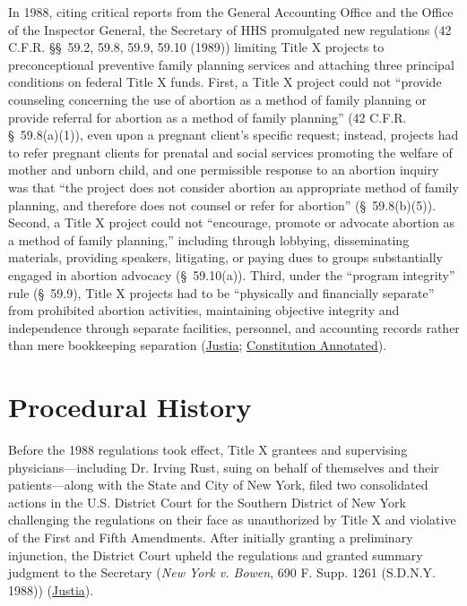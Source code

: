 \documentclass[12pt]{article}
\begin{document}
In 1988, citing critical reports from the General Accounting Office and the Office of the Inspector General, the Secretary of HHS promulgated new regulations (42 C.F.R. \S\S~59.2, 59.8, 59.9, 59.10 (1989)) limiting Title X projects to preconceptional preventive family planning services and attaching three principal conditions on federal Title X funds. First, a Title X project could not ``provide counseling concerning the use of abortion as a method of family planning or provide referral for abortion as a method of family planning'' (42 C.F.R. \S~59.8(a)(1)), even upon a pregnant client's specific request; instead, projects had to refer pregnant clients for prenatal and social services promoting the welfare of mother and unborn child, and one permissible response to an abortion inquiry was that ``the project does not consider abortion an appropriate method of family planning, and therefore does not counsel or refer for abortion'' (\S~59.8(b)(5)). Second, a Title X project could not ``encourage, promote or advocate abortion as a method of family planning,'' including through lobbying, disseminating materials, providing speakers, litigating, or paying dues to groups substantially engaged in abortion advocacy (\S~59.10(a)). Third, under the ``program integrity'' rule (\S~59.9), Title X projects had to be ``physically and financially separate'' from prohibited abortion activities, maintaining objective integrity and independence through separate facilities, personnel, and accounting records rather than mere bookkeeping separation (\href{https://supreme.justia.com/cases/federal/us/500/173/}{Justia}; \href{https://www.law.cornell.edu/constitution-conan/amendment-1/selective-funding-arrangements}{Constitution Annotated}).

\section{Procedural History}

Before the 1988 regulations took effect, Title X grantees and supervising physicians---including Dr. Irving Rust, suing on behalf of themselves and their patients---along with the State and City of New York, filed two consolidated actions in the U.S. District Court for the Southern District of New York challenging the regulations on their face as unauthorized by Title X and violative of the First and Fifth Amendments. After initially granting a preliminary injunction, the District Court upheld the regulations and granted summary judgment to the Secretary (\textit{New York v. Bowen}, 690 F. Supp. 1261 (S.D.N.Y. 1988)) (\href{https://supreme.justia.com/cases/federal/us/500/173/}{Justia}).
\end{document}
